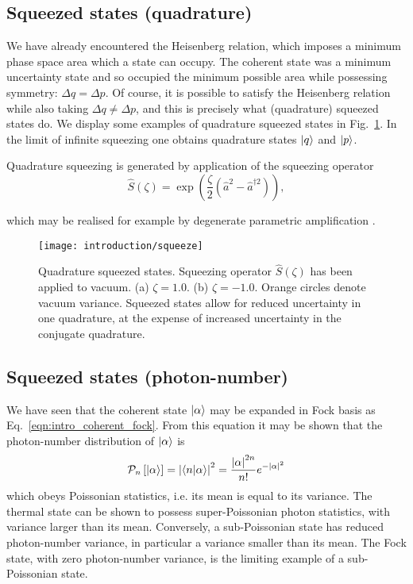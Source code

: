 \FloatBarrier
\subsection{Squeezed states (quadrature)}

We have already encountered the Heisenberg relation, which imposes a minimum phase space area which a state can occupy. The coherent state was a minimum uncertainty state and so occupied the minimum possible area while possessing symmetry: $\Delta q = \Delta p$. Of course, it is possible to satisfy the Heisenberg relation while also taking $\Delta q \ne \Delta p$, and this is precisely what (quadrature) squeezed states do. We display some examples of quadrature squeezed states in Fig.~\ref{fig:intro_quadrature_squeezed_wigner}. In the limit of infinite squeezing one obtains quadrature states $\ket{q}$ and $\ket{p}$.

Quadrature squeezing is generated by application of the squeezing operator
\begin{equation}
\hat{S}\left(\zeta\right) = \exp \left(\frac{\zeta}{2} \left(\hat{a}^2 - \hat{a}^{\dagger 2}\right) \right),
\end{equation}

\noindent which may be realised for example by degenerate parametric amplification \cite{Boyd1994}.

\begin{figure}[htp]
\captionsetup{width=0.8\linewidth}
\centering
\texttt{[image: introduction/squeeze]}
\caption{\label{fig:intro_quadrature_squeezed_wigner} Quadrature squeezed states. Squeezing operator $\hat{S}\left(\zeta\right)$ has been applied to vacuum. (a) $\zeta = 1.0$. (b) $\zeta = -1.0$. Orange circles denote vacuum variance. Squeezed states allow for reduced uncertainty in one quadrature, at the expense of increased uncertainty in the conjugate quadrature.}
\end{figure}

\FloatBarrier
\subsection{Squeezed states (photon-number)}
We have seen that the coherent state $\ket{\alpha}$ may be expanded in Fock basis as Eq.~\ref{eqn:intro_coherent_fock}. From this equation it may be shown that the photon-number distribution of $\ket{\alpha}$ is 
\begin{equation}
\mathcal{P}_n\left[\ket{\alpha}\right] = \left| \ip{n}{\alpha} \right|^2 = \frac{\left|\alpha\right|^{2n}}{n!} e^{-\left|\alpha\right|^2}
\end{equation}
which obeys Poissonian statistics, i.e. its mean is equal to its variance. The thermal state can be shown to possess super-Poissonian photon statistics, with variance larger than its  mean. Conversely, a sub-Poissonian state has reduced photon-number variance, in particular a variance smaller than its mean. The Fock state, with zero photon-number variance, is the limiting example of a sub-Poissonian state.

